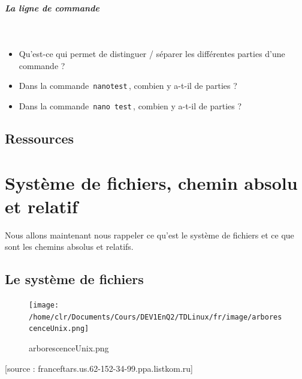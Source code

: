\documentclass[11pt,a4paper]{article}
\begin{document}
			
		\subparagraph{La ligne de commande} 
		
                \textcolor{white}{.} \par
            
					\begin{itemize}
				
			\item 
										Qu'est-ce qui permet de distinguer / s\'eparer les diff\'erentes parties d'une commande ? 
										 \textcolor{gray}{\underline{\hspace*{10em}}} 
			\item 
										Dans la commande \,\verb|nanotest|\,, combien y a-t-il de parties ?  
										 \textcolor{gray}{\underline{\hspace*{1em}}} 
			\item 
										Dans la commande \,\verb|nano test|\,, combien y a-t-il de parties ?  
										 \textcolor{gray}{\underline{\hspace*{1em}}} 
					\end{itemize}
				\subsection{Ressources}\section{Syst\`eme de fichiers, chemin absolu et relatif}
				Nous allons maintenant nous rappeler ce qu'est le syst\`eme de fichiers et ce que sont les chemins absolus et relatifs.
			
            \par
        \subsection{Le syst\`eme de fichiers}\begin{figure}[hbt]
				    \begin{center}
					\texttt{[image: /home/clr/Documents/Cours/DEV1EnQ2/TDLinux/fr/image/arborescenceUnix.png]}
						\end{center}
                
                    \caption[arborescenceUnix.png]{arborescenceUnix.png}
                \end{figure}
                    
			    
			    [source : franceftars.us.62-152-34-99.ppa.listkom.ru]
        
            \par
        
\end{document}
